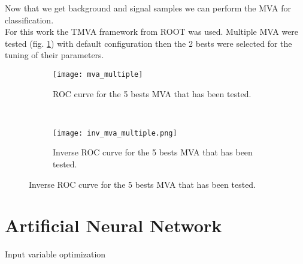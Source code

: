 \label{sec:unchapitre}


Now that we get background and signal samples we can perform the MVA for classification.\\
For this work the TMVA framework from ROOT was used. Multiple MVA were tested (fig. \ref{mva_multiple}) with default configuration then the 2
bests were selected for the tuning of their parameters.\\

\begin{figure}[h!]
\centering
    \begin{subfigure}[h!]{0.4\textwidth}
    \centering
        \texttt{[image: mva\_multiple]}
        \caption{ROC curve for the 5 bests MVA that has been tested.}
        \label{mva_multiple}
  \end{subfigure}
  ~
    \begin{subfigure}[h!]{0.4\textwidth}
    \centering
        \texttt{[image: inv\_mva\_multiple.png]}
        \caption{Inverse ROC curve for the 5 bests MVA that has been tested.}
        \label{inv_mva_multiple}
  \end{subfigure}
\end{figure}


\section{Artificial Neural Network}


Input variable optimization






